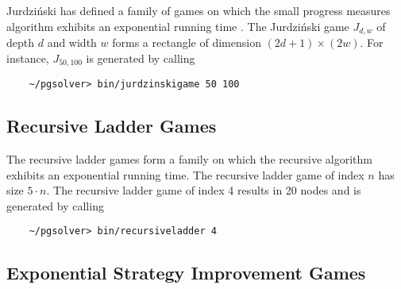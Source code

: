Jurdzi{\'n}ski has defined a family of games on which the small progress measures algorithm
exhibits an exponential running time \cite{Jurdzinski/00}. The Jurdzi{\'n}ski game $J_{d,w}$ of depth 
$d$ and width $w$ forms a rectangle of dimension $(2d+1) \times (2w)$. For instance, $J_{50,100}$
is generated by calling
\begin{verbatim}
    ~/pgsolver> bin/jurdzinskigame 50 100
\end{verbatim}






\subsection{Recursive Ladder Games}

%


The recursive ladder games form a family on which the recursive algorithm exhibits an exponential
running time.  The recursive ladder game of index $n$ has size $5 \cdot n$. 
The recursive ladder game of index 4 results in 20 nodes and is generated by calling
\begin{verbatim}
    ~/pgsolver> bin/recursiveladder 4
\end{verbatim}





\subsection{Exponential Strategy Improvement Games}

